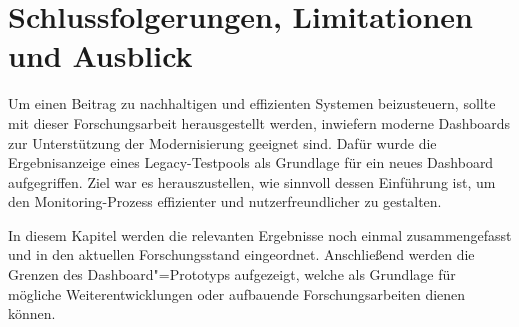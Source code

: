 \chapter{Schlussfolgerungen, Limitationen und Ausblick} %
\label{ch:Fazit}




Um einen Beitrag zu nachhaltigen und effizienten Systemen beizusteuern, sollte mit dieser Forschungsarbeit herausgestellt werden, inwiefern moderne Dash\-boards zur Unterstützung der Modernisierung geeignet sind. Dafür wurde die Ergebnisanzeige eines Legacy-Testpools als Grundlage für ein neues Dash\-board aufgegriffen. Ziel war es herauszustellen, wie sinnvoll dessen Einführung ist, um den Monitoring-Prozess effizienter und nutzerfreundlicher zu gestalten.

In diesem Kapitel werden die relevanten Ergebnisse noch einmal zusammengefasst und in den aktuellen Forschungsstand eingeordnet. Anschließend werden die Grenzen des Dash\-board"=Prototyps aufgezeigt, welche als Grundlage für mögliche Weiterentwicklungen oder aufbauende Forschungsarbeiten dienen können.






